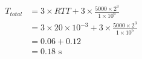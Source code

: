 \begin{enumerate}[leftmargin=\labelsep]
        $$
          \begin{aligned}
            T_{total} & = 3 \times RTT + 3 \times \frac{5000 \times 2^3}{1 \times 10^6}               \\
                      & = 3 \times 20 \times 10^{-3} + 3 \times \frac{5000 \times 2^3}{1 \times 10^6} \\
                      & = 0.06 + 0.12                                                                 \\
                      & = 0.18 \text{ s}
          \end{aligned}
        $$
\end{enumerate}